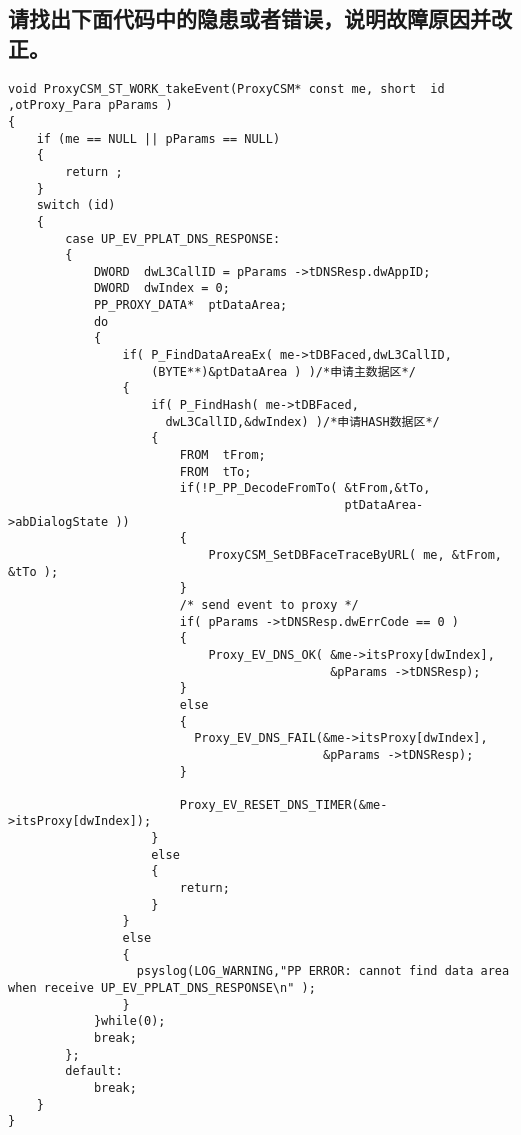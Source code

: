 ﻿\documentclass  [11pt,twocolumn,landscape]{article}
\begin{document}
\subsection{请找出下面代码中的隐患或者错误，说明故障原因并改正。}
\begin{lstlisting}
void ProxyCSM_ST_WORK_takeEvent(ProxyCSM* const me, short  id ,otProxy_Para pParams )
{
    if (me == NULL || pParams == NULL)
    {
        return ;
    }
    switch (id)
    {
        case UP_EV_PPLAT_DNS_RESPONSE:
        {
            DWORD  dwL3CallID = pParams ->tDNSResp.dwAppID; 
            DWORD  dwIndex = 0;
            PP_PROXY_DATA*  ptDataArea;   
            do
            {   
                if( P_FindDataAreaEx( me->tDBFaced,dwL3CallID,
                    (BYTE**)&ptDataArea ) )/*申请主数据区*/
                {
                    if( P_FindHash( me->tDBFaced,
                      dwL3CallID,&dwIndex) )/*申请HASH数据区*/
                    {
                        FROM  tFrom;
                        FROM  tTo;
                        if(!P_PP_DecodeFromTo( &tFrom,&tTo,
                                               ptDataArea->abDialogState ))
                        {
                            ProxyCSM_SetDBFaceTraceByURL( me, &tFrom, &tTo );
                        }                             
                        /* send event to proxy */ 
                        if( pParams ->tDNSResp.dwErrCode == 0 )
                        {
                            Proxy_EV_DNS_OK( &me->itsProxy[dwIndex],
                                             &pParams ->tDNSResp);
                        }
                        else
                        {
                          Proxy_EV_DNS_FAIL(&me->itsProxy[dwIndex],
                                            &pParams ->tDNSResp);
                        }

                        Proxy_EV_RESET_DNS_TIMER(&me->itsProxy[dwIndex]);
                    }
                    else
                    {
                        return;
                    }
                }
                else
                {
                  psyslog(LOG_WARNING,"PP ERROR: cannot find data area when receive UP_EV_PPLAT_DNS_RESPONSE\n" );
                }
            }while(0);                 
            break;
        };
        default:
            break;
    }
}
\end{lstlisting}
\end{document}

